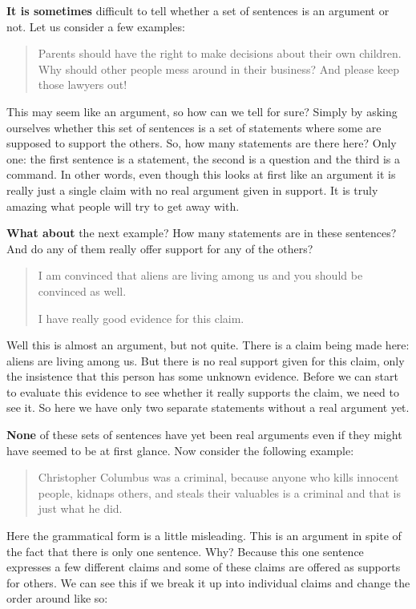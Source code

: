 \documentclass[]{book}
\newenvironment{argument}{\begin{quote}\normalsize}{\end{quote}}
\begin{document}
\textbf{It is sometimes} difficult to tell whether a set of sentences is an argument or not. Let us consider a few examples:

\begin{argument}
Parents should have the right to make decisions about their own
children. Why should other people mess around in their business? And
please keep those lawyers out!
\end{argument}

This may seem like an argument, so how can we tell for sure? Simply by asking ourselves whether this set of sentences is a set of statements where some are supposed to support the others. So, how many statements are there here? Only one: the first sentence is a statement, the second is a question and the third is a command. In other words, even though this looks at first like an argument it is really just a single claim with no real argument given in support. It is truly amazing what people will try to get away with.

\textbf{What about} the next example? How many statements are in these sentences? And do any of them really offer support for any of the others?

\begin{argument}
I am convinced that aliens are living among us and you should be
convinced as well.

I have really good evidence for this claim.
\end{argument}

Well this is almost an argument, but not quite. There is a claim being made here: aliens are living among us. But there is no real support given for this claim, only the insistence that this person has some unknown evidence. Before we can start to evaluate this evidence to see whether it really supports the claim, we need to see it. So here we have only two separate statements without a real argument yet.

\textbf{None} of these sets of sentences have yet been real arguments even if they might have seemed to be at first glance. Now consider the following example:

\begin{argument}
Christopher Columbus was a criminal, because anyone who kills innocent
people, kidnaps others, and steals their valuables is a criminal and
that is just what he did.
\end{argument}

Here the grammatical form is a little misleading. This is an argument in spite of the fact that there is only one sentence. Why? Because this one sentence expresses a few different claims and some of these claims are offered as supports for others. We can see this if we break it up into individual claims and change the order around like so:
\end{document}
